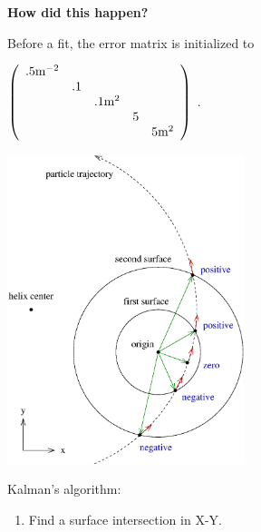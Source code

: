 \begin{slide*}

\slideframe{}
\huge
{}
\Large

\begin{minipage}[t]{\linewidth}

\vspace{0.5cm}

{\huge \bf How did this happen?}

\vspace{-0.6cm}

\begin{minipage}{0.65\linewidth}
Before a fit, the error matrix is initialized to
\end{minipage} {\scriptsize $\left(\begin{array}{c c c c c}
.5 \mbox{m}^{-2} & & & & \\
 & .1 & & & \\
 & & .1 \mbox{m}^2& & \\
 & & & 5 & \\
 & & & & 5 \mbox{m}^2 \\
\end{array}\right)$ }. \\

\vspace{-0.6cm}

\includegraphics[height=9cm]{xdotp_correct.eps}
\hspace{0.2cm} \begin{minipage}[b]{7cm}
Kalman's algorithm:
\begin{enumerate}

  \item Find a surface intersection in X-Y.


\end{enumerate}
\end{minipage}
\end{minipage}
\end{slide*}
